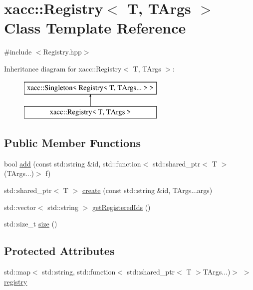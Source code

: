 \hypertarget{a00056}{}\section{xacc\+:\+:Registry$<$ T, T\+Args $>$ Class Template Reference}
\label{a00056}


{\ttfamily \#include $<$Registry.\+hpp$>$}

Inheritance diagram for xacc\+:\+:Registry$<$ T, T\+Args $>$\+:\begin{figure}[H]
\begin{center}
\leavevmode
\includegraphics[height=2.000000cm]{a00056}
\end{center}
\end{figure}
\subsection*{Public Member Functions}
\begin{DoxyCompactItemize}
\item 
bool \hyperlink{a00056_a9aa172c2603171db067b40bd62ba53c6}{add} (const std\+::string \&id, std\+::function$<$ std\+::shared\+\_\+ptr$<$ T $>$(T\+Args...)$>$ f)
\item 
std\+::shared\+\_\+ptr$<$ T $>$ \hyperlink{a00056_aecccbd5534276cbdd1553e43c942219b}{create} (const std\+::string \&id, T\+Args...\+args)
\item 
std\+::vector$<$ std\+::string $>$ \hyperlink{a00056_a8bff6f5c50534375abc4026662d69d2e}{get\+Registered\+Ids} ()
\item 
std\+::size\+\_\+t \hyperlink{a00056_a2352dd7c6c85ae5c5e232b577dfa2544}{size} ()
\end{DoxyCompactItemize}
\subsection*{Protected Attributes}
\begin{DoxyCompactItemize}
\item 
std\+::map$<$ std\+::string, std\+::function$<$ std\+::shared\+\_\+ptr$<$ T $>$T\+Args...)$>$ $>$ \hyperlink{a00056_a46460ecacc7facb6936b3c1ec6d618d7}{registry}
\end{DoxyCompactItemize}
